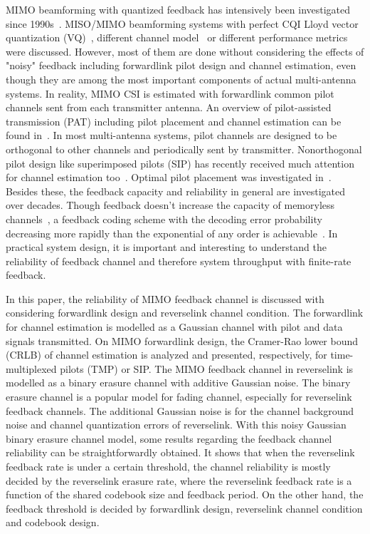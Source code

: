 \documentclass[10pt,fleqn, twocolumn]{IEEEtran}
\begin{document}
MIMO beamforming with quantized feedback has intensively been
investigated since 1990s~\cite{Gerlach94}. MISO/MIMO beamforming
systems with perfect CQI Lloyd vector quantization
(VQ)~\cite{Narula98}, different channel model~\cite{Mukka03} or
different performance metrics~\cite{PXia04,Roh04} were discussed.
However, most of them are done without considering the effects of
"noisy" feedback including forwardlink pilot design and channel
estimation, even though they are among the most important
components of actual multi-antenna systems. In reality, MIMO CSI
is estimated with forwardlink common pilot channels sent from each
transmitter antenna. An overview of pilot-assisted transmission
(PAT) including pilot placement and channel estimation can be
found in~\cite{Tong04}. In most multi-antenna systems, pilot
channels are designed to be orthogonal to other channels and
periodically sent by transmitter. Nonorthogonal pilot design like
superimposed pilots (SIP) has recently received much attention for
channel estimation too~\cite{Coldrey06}. Optimal pilot placement
was investigated in~\cite{Dong02}. Besides these, the feedback
capacity and reliability in general are investigated over decades.
Though feedback doesn't increase the capacity of memoryless
channels~\cite{Shannon56,Kim06}, a feedback coding scheme with the
decoding error probability decreasing more rapidly than the
exponential of any order is achievable~\cite{Kramer69}. In
practical system design, it is important and interesting to
understand the reliability of feedback channel and therefore
system throughput with finite-rate feedback.

In this paper, the reliability of MIMO feedback channel is
discussed with considering forwardlink design and reverselink
channel condition. The forwardlink for channel estimation is
modelled as a Gaussian channel with pilot and data signals
transmitted. On MIMO forwardlink design, the Cramer-Rao lower
bound (CRLB) of channel estimation is analyzed and presented,
respectively, for time-multiplexed pilots (TMP) or SIP. The MIMO
feedback channel in reverselink is modelled as a binary erasure
channel with additive Gaussian noise. The binary erasure channel
is a popular model for fading channel, especially for reverselink
feedback channels. The additional Gaussian noise is for the
channel background noise and channel quantization errors of
reverselink. With this noisy Gaussian binary erasure channel
model, some results regarding the feedback channel reliability can
be straightforwardly obtained. It shows that when the reverselink
feedback rate is under a certain threshold, the channel
reliability is mostly decided by the reverselink erasure rate,
where the reverselink feedback rate is a function of the shared
codebook size and feedback period. On the other hand, the feedback
threshold is decided by forwardlink design, reverselink channel
condition and codebook design.
\end{document}

